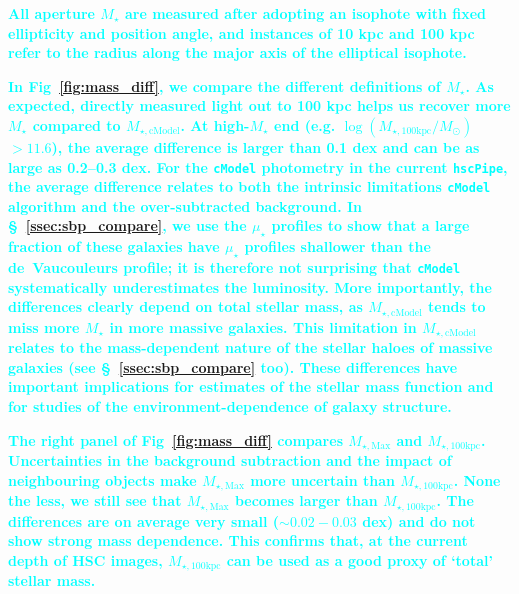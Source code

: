\documentclass[fleqn,usenatbib]{mnras}
\def\cmodel{\texttt{cModel}}
\def\mstar{{$M_{\star}$}}
\def\mtot{{$M_{\star,100\mathrm{kpc}}$}}
\def\mmax{{$M_{\star,\mathrm{Max}}$}}
\def\mcmodel{{$M_{\star,\mathrm{cModel}}$}}
\def\logmtot{{$\log (M_{\star,100\mathrm{kpc}}/M_{\odot})$}}
\def\mden{{$\mu_{\star}$}}
\newcommand{\song}[1]{\textcolor{cyan}{\textbf{#1}}}
\begin{document}
    \song{
    All aperture \mstar{} are measured after adopting an isophote with fixed 
    ellipticity and position angle, and instances of 10 kpc and 100 kpc refer to 
    the radius along the major axis of the elliptical isophote.
    }
       
    
    \song{
    In Fig~\ref{fig:mass_diff}, we compare the different definitions of \mstar{}. 
    As expected, directly measured light out to 100 kpc helps us recover more \mstar{} 
    compared to \mcmodel{}.
    At high-\mstar{} end (e.g. \logmtot{}$>11.6$), the average difference is larger 
    than 0.1 dex and can be as large as 0.2--0.3 dex.  
    For the \cmodel{} photometry in the current \texttt{hscPipe}, the average 
    difference relates to both the intrinsic limitations \cmodel{} algorithm and the 
    over-subtracted background. 
    In \S~\ref{ssec:sbp_compare}, we use the \mden{} profiles to show that a large 
    fraction of these galaxies have \mden{} profiles shallower than the de~Vaucouleurs 
    profile; it is therefore not surprising that \cmodel{} systematically 
    underestimates the luminosity.
    More importantly, the differences clearly depend on total stellar mass, as 
    \mcmodel{} tends to miss more \mstar{} in more massive galaxies.  
    This limitation in \mcmodel{} relates to the mass-dependent nature of the 
    stellar haloes of massive galaxies (see \S~\ref{ssec:sbp_compare} too).
    These differences have important implications for estimates of the stellar 
    mass function and for studies of the environment-dependence of galaxy structure. 
    }
    
    \song{
    The right panel of Fig~\ref{fig:mass_diff} compares \mmax{} and \mtot{}.  
    Uncertainties in the background subtraction and the impact of neighbouring 
    objects make \mmax{} more uncertain than \mtot{}. 
    None the less, we still see that \mmax{} becomes larger than \mtot{}. 
    The differences are on average very small ($\sim0.02-0.03$ dex) and do not show 
    strong mass dependence.  
    This confirms that, at the current depth of HSC images, \mtot{} can be used as 
    a good proxy of `total' stellar mass. 
    }  
   
\end{document}
